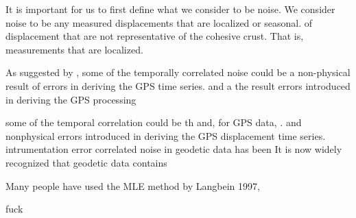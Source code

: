 \documentclass[10pt,a4paper]{article}
\begin{document}
It is important for us to first define what we consider to be noise. We consider noise to be any measured displacements that are localized or seasonal. of displacement that are not representative of the cohesive crust. That is, measurements that are localized.   

As suggested by \citep{Langbein2008,Langbein2012}, some of the temporally correlated noise could be a non-physical result of errors in deriving the GPS time series.  and a the result errors introduced in deriving the GPS processing

some of the temporal correlation could be th and, for GPS data, . and nonphysical errors introduced in deriving the GPS displacement time series.  intrumentation error  correlated noise in geodetic data has been  
It is now widely recognized that geodetic data contains 

Many people have used the MLE method by Langbein 1997, 

fuck
\citep{Hines2016}


  
\end{document}
